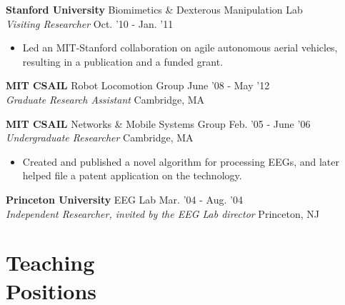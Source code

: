 \documentclass[margin]{res}
\begin{document}
\begin{resume}
{\bf Stanford University} Biomimetics \& Dexterous Manipulation Lab \\ {\it Visiting Researcher}  \hfill Oct. '10 - Jan. '11 
 \begin{itemize} \itemsep -2pt  %
\item Led an MIT-Stanford collaboration on agile autonomous aerial vehicles, resulting in a publication and a funded grant.
 \end{itemize}

{\bf MIT CSAIL} Robot Locomotion Group \hfill June '08 - May '12 \\  {\it Graduate Research Assistant} \hfill Cambridge, MA 
 
% 
{\bf MIT CSAIL} Networks \& Mobile Systems Group \hfill Feb. '05 - June '06 \\{\it Undergraduate Researcher}  \hfill Cambridge, MA 
 \begin{itemize} \itemsep -2pt  %
\item Created and published a novel algorithm for processing EEGs, and later helped file a patent application on the technology.
\end{itemize}


{\bf Princeton University} EEG Lab \hfill Mar. '04 - Aug. '04 \\ {\it Independent Researcher, invited by the EEG Lab director} \hfill Princeton, NJ 
 
\section{Teaching\\Positions}


\end{resume}
\end{document}
